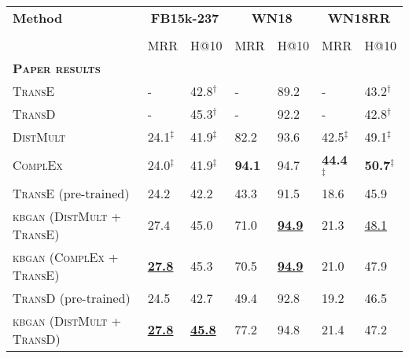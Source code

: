 \begin{table}[h]
    \centering
    \begin{tabular}{lllllll}
        \toprule
        \textbf{Method} &
        \multicolumn{2}{c}{\textbf{FB15k-237}} & 
        \multicolumn{2}{c}{\textbf{WN18}} & 
        \multicolumn{2}{c}{\textbf{WN18RR}}\\
        
        \cmidrule{2-6} \cmidrule{7-7} \\
        {} & MRR & H@10 & MRR & H@10 & MRR & H@10 \\
        
        \midrule
        
        \textbf{\textsc{Paper results}} 
        &  &  &  &  &  & \\
          
        \textsc{TransE}    
        & - & 42.8$^{\dag}$ & - & 89.2 & -    & 43.2$^{\dag}$ \\
        
        \textsc{TransD}    
        & - & 45.3$^{\dag}$ & - & 92.2 & -    & 42.8$^{\dag}$ \\ 
        
        \textsc{DistMult}  
        & 24.1$^{\ddag}$  & 41.9$^{\ddag}$ & 82.2 & 93.6 & 42.5$^{\ddag}$ & 49.1$^{\ddag}$ \\
        
        \textsc{ComplEx}   
        & 24.0$^{\ddag}$  & 41.9$^{\ddag}$ & \textbf{94.1} & 94.7 & \textbf{44.4}$^{\ddag}$ & \textbf{50.7}$^{\ddag}$ \\

        \midrule
          
        \textsc{TransE} (pre-trained)                         & 24.2    & 42.2  & 43.3   & 91.5 & 18.6 & 45.9 \\
        
        \textsc{kbgan} (\textsc{DistMult} + \textsc{TransE})  & 27.4  & 45.0 & 71.0 & \textbf{\underline{94.9}} & 21.3 & \underline{48.1} \\
        \textsc{kbgan} (\textsc{ComplEx} + \textsc{TransE})   
        & \textbf{\underline{27.8}} & 45.3 & 70.5  & \textbf{\underline{94.9}} & 21.0 & 47.9 \\
        
        \textsc{TransD} (pre-trained)                         & 24.5 & 42.7 & 49.4  & 92.8 & 19.2 & 46.5 \\
        
        \textsc{kbgan} (\textsc{DistMult} + \textsc{TransD})  
        & \textbf{\underline{27.8}} & \textbf{\underline{45.8}} 
        & 77.2 & 94.8 & 21.4 & 47.2\\
        

\end{tabular}
\end{table}
